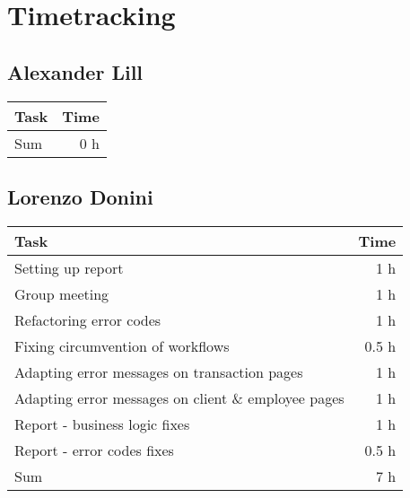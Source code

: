 \chapter{Timetracking}\label{chapter:timetracking}
\section*{Alexander Lill}
\begin{table}[h!tpb]
  \centering
  \begin{tabularx}{\textwidth}{X r}
    \toprule
      Task & Time \\
    \midrule
    \midrule
      Sum & 0 h \\
    \bottomrule
  \end{tabularx}
\end{table}

\clearpage
\section*{Lorenzo Donini}
\begin{table}[h!tpb]
  \centering
  \begin{tabularx}{\textwidth}{X r}
    \toprule
      Task & Time \\
    \midrule
      Setting up report & 1 h \\      
      Group meeting & 1 h \\
      Refactoring error codes & 1 h \\
      Fixing circumvention of workflows & 0.5 h \\
      Adapting error messages on transaction pages & 1 h \\
      Adapting error messages on client \& employee pages & 1 h \\
      Report - business logic fixes & 1 h \\
      Report - error codes fixes & 0.5 h \\
    \midrule
      Sum & 7 h \\
    \bottomrule
  \end{tabularx}
\end{table}

\clearpage
